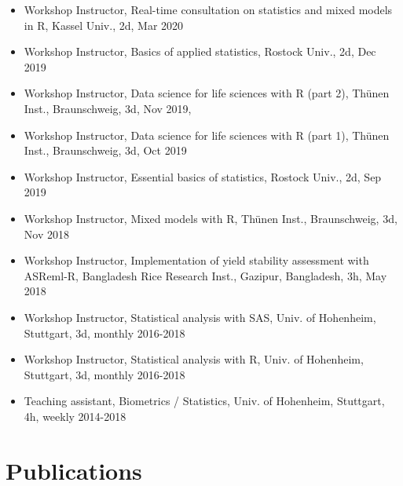 \documentclass[11pt, a4paper]{awesome-cv}
\providecommand{\tightlist}{%
	\setlength{\itemsep}{0pt}\setlength{\parskip}{0pt}}
\newcounter{papers}
\begin{document}
\begin{itemize}
\tightlist
\item
  Workshop Instructor, Real-time consultation on statistics and mixed models in R, Kassel Univ., 2d, Mar 2020
\item
  Workshop Instructor, Basics of applied statistics, Rostock Univ., 2d, Dec 2019
\item
  Workshop Instructor, Data science for life sciences with R (part 2), Thünen Inst., Braunschweig, 3d, Nov 2019,
\item
  Workshop Instructor, Data science for life sciences with R (part 1), Thünen Inst., Braunschweig, 3d, Oct 2019
\item
  Workshop Instructor, Essential basics of statistics, Rostock Univ., 2d, Sep 2019
\item
  Workshop Instructor, Mixed models with R, Thünen Inst., Braunschweig, 3d, Nov 2018
\item
  Workshop Instructor, Implementation of yield stability assessment with ASReml-R, Bangladesh Rice Research Inst., Gazipur, Bangladesh, 3h, May 2018
\item
  Workshop Instructor, Statistical analysis with SAS, Univ. of Hohenheim, Stuttgart, 3d, monthly 2016-2018
\item
  Workshop Instructor, Statistical analysis with R, Univ. of Hohenheim, Stuttgart, 3d, monthly 2016-2018
\item
  Teaching assistant, Biometrics / Statistics, Univ. of Hohenheim, Stuttgart, 4h, weekly 2014-2018
\end{itemize}

\hypertarget{publications}{%
\section{Publications}\label{publications}}

\newrefcontext[sorting=none]\setcounter{papers}{0}\pagebreak[3]
\printbibliography[category=bib-D:/Coding/CV/publications.bib-25479.79,heading=none]\setcounter{papers}{0}

\nocite{buntaran2020cross,
kukowski2020auswirkungen,
schmidt2020estimating,
schmidt2019heritability,
schmidt2019estimating,
schmidt2018more,
tulinska2018humoral,
schmidt2017variability,
zeljenkova2016one}
\end{document}
